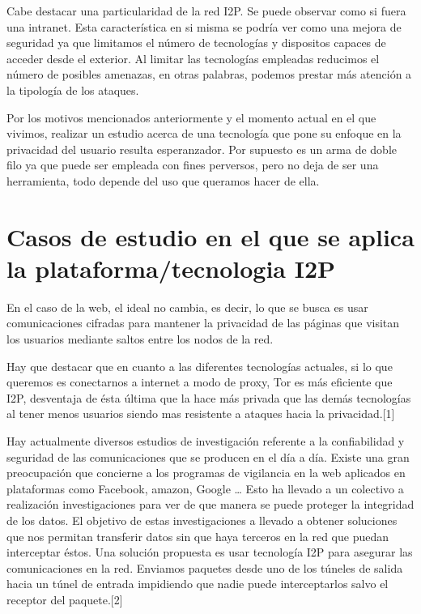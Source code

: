 \documentclass{article}
\begin{document}
Cabe destacar una particularidad de la red I2P. Se puede observar como si fuera una intranet. Esta característica en si misma se podría ver 
como una mejora de seguridad ya que limitamos el número de tecnologías y dispositos capaces de acceder desde el exterior. Al limitar las tecnologías 
empleadas reducimos el número de posibles amenazas, en otras palabras, podemos prestar más atención a la tipología de los ataques. 

Por los motivos mencionados anteriormente y el momento actual en el que vivimos, realizar un estudio acerca de una tecnología que 
pone su enfoque en la privacidad del usuario resulta esperanzador. Por supuesto es un arma de doble filo ya que puede ser empleada con fines 
perversos, pero no deja de ser una herramienta, todo depende del uso que queramos hacer de ella.

\section{Casos de estudio en el que se aplica la plataforma/tecnologia I2P}

En el caso de la web, el ideal no cambia, es decir, lo que se busca es usar comunicaciones cifradas para mantener la privacidad de las páginas que visitan los usuarios mediante saltos entre los nodos de la red.

Hay que destacar que en cuanto a las diferentes tecnologías actuales, si lo que queremos es conectarnos a internet a modo de proxy,  Tor es más eficiente que I2P, desventaja de ésta última que la hace más privada que las demás tecnologías al tener menos usuarios siendo mas resistente a ataques hacia la privacidad.[1]

Hay actualmente diversos estudios de investigación referente a la confiabilidad y seguridad de las comunicaciones que se producen en el día a día.
Existe una gran preocupación que concierne a los programas de vigilancia en la web aplicados en plataformas como Facebook, amazon, Google … Esto ha llevado a un colectivo a realización investigaciones para ver de que manera se puede proteger la integridad de los datos. El objetivo de estas investigaciones a llevado a obtener soluciones que nos permitan transferir datos sin que haya terceros
en la red que puedan interceptar éstos.
Una solución propuesta es usar tecnología I2P para asegurar las comunicaciones en la red. Enviamos paquetes desde uno de los túneles de salida hacia un túnel de entrada  impidiendo que nadie puede interceptarlos salvo el receptor del paquete.[2]
\end{document}
